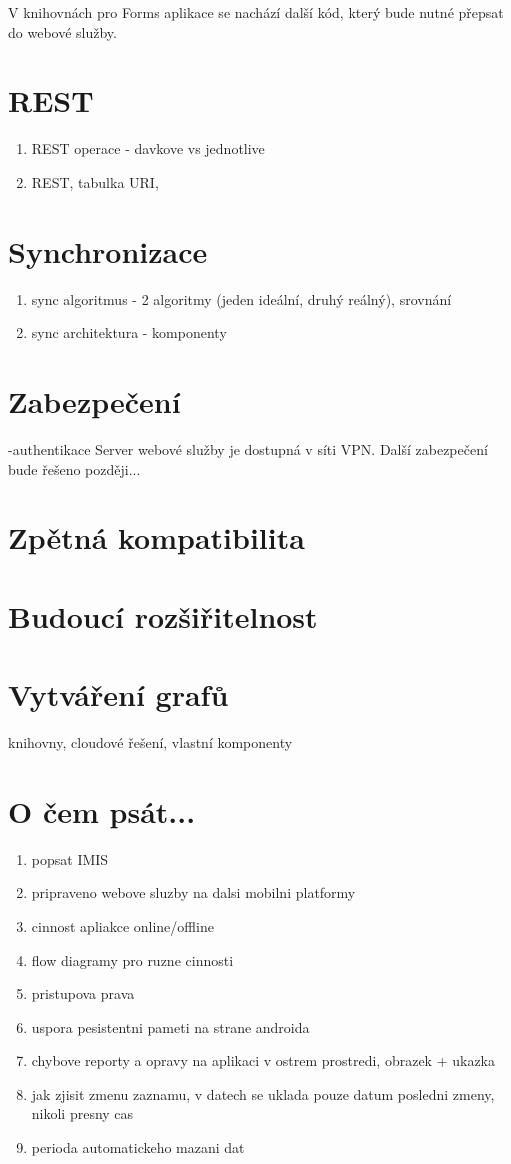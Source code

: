 \documentclass{bakalarka}
\begin{document}
V knihovnách pro Forms aplikace se nachází další kód, který bude nutné přepsat do webové služby.
\section{REST}
\begin{enumerate}
\item REST operace - davkove vs jednotlive
\item REST, tabulka URI, 
\end{enumerate}

\section{Synchronizace}
\begin{enumerate}
\item sync algoritmus - 2 algoritmy (jeden ideální, druhý reálný), srovnání
\item sync architektura - komponenty
\end{enumerate}

\section{Zabezpečení}
-authentikace
Server webové služby je dostupná v síti VPN. Další zabezpečení bude řešeno později...

\section{Zpětná kompatibilita}

\section{Budoucí rozšiřitelnost}

\section{Vytváření grafů}
knihovny, cloudové řešení, vlastní komponenty

\section{O čem psát...}
\begin{enumerate}
\item popsat IMIS 
\item pripraveno webove sluzby na dalsi mobilni platformy
\item cinnost apliakce online/offline
\item flow diagramy pro ruzne cinnosti
\item pristupova prava
\item uspora pesistentni pameti na strane androida
\item chybove reporty a opravy na aplikaci v ostrem prostredi, obrazek + ukazka
\item jak zjisit zmenu zaznamu, v datech se uklada pouze datum posledni zmeny, nikoli presny cas
\item perioda automatickeho mazani dat
\end{enumerate}

\appendix

%
\end{document}
